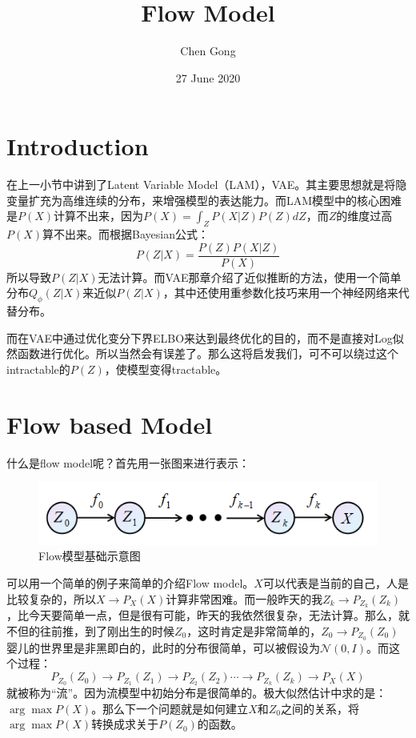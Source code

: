 \documentclass[a4paper]{article}
\title{Flow Model}
\author{Chen Gong}
\date{27 June 2020}
\begin{document}
\maketitle

\section{Introduction}
在上一小节中讲到了Latent Variable Model（LAM），VAE。其主要思想就是将隐变量扩充为高维连续的分布，来增强模型的表达能力。而LAM模型中的核心困难是$P(X)$计算不出来，因为$P(X) = \int_Z P(X|Z)P(Z) dZ$，而$Z$的维度过高$P(X)$算不出来。而根据Bayesian公式：
\begin{equation}
    P(Z|X) = \frac{P(Z)P(X|Z)}{P(X)}
\end{equation}
所以导致$P(Z|X)$无法计算。而VAE那章介绍了近似推断的方法，使用一个简单分布$Q_\phi(Z|X)$来近似$P(Z|X)$，其中还使用重参数化技巧来用一个神经网络来代替分布。

而在VAE中通过优化变分下界ELBO来达到最终优化的目的，而不是直接对Log似然函数进行优化。所以当然会有误差了。那么这将启发我们，可不可以绕过这个intractable的$P(Z)$，使模型变得tractable。

\section{Flow based Model}
什么是flow model呢？首先用一张图来进行表示：
\begin{figure}[H]
    \centering
    \includegraphics[width=.55\textwidth]{微信图片_20200628202302.png}
    \caption{Flow模型基础示意图}
    \label{fig:my_label_1}
\end{figure}
可以用一个简单的例子来简单的介绍Flow model。$X$可以代表是当前的自己，人是比较复杂的，所以$X \to P_X(X)$计算非常困难。而一般昨天的我$Z_k \to P_{Z_k}(Z_k)$，比今天要简单一点，但是很有可能，昨天的我依然很复杂，无法计算。那么，就不但的往前推，到了刚出生的时候$Z_0$，这时肯定是非常简单的，$Z_0 \to P_{Z_0}(Z_0)$婴儿的世界里是非黑即白的，此时的分布很简单，可以被假设为$\mathcal{N}(0,I)$。而这个过程：
\begin{equation}
    P_{Z_0}(Z_0) \to P_{Z_1}(Z_1) \to P_{Z_2}(Z_2) \cdots \to P_{Z_k}(Z_k) \to P_{X}(X)
\end{equation}
就被称为“流”。因为流模型中初始分布是很简单的。极大似然估计中求的是：$\arg\max P(X)$。那么下一个问题就是如何建立$X$和$Z_0$之间的关系，将$\arg\max P(X)$转换成求关于$P(Z_0)$的函数。
\end{document}
